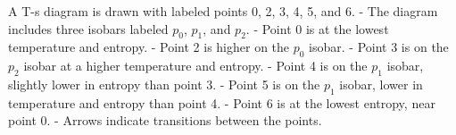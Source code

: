 A T-s diagram is drawn with labeled points 0, 2, 3, 4, 5, and 6.  
- The diagram includes three isobars labeled \( p_0 \), \( p_1 \), and \( p_2 \).  
- Point 0 is at the lowest temperature and entropy.  
- Point 2 is higher on the \( p_0 \) isobar.  
- Point 3 is on the \( p_2 \) isobar at a higher temperature and entropy.  
- Point 4 is on the \( p_1 \) isobar, slightly lower in entropy than point 3.  
- Point 5 is on the \( p_1 \) isobar, lower in temperature and entropy than point 4.  
- Point 6 is at the lowest entropy, near point 0.  
- Arrows indicate transitions between the points.